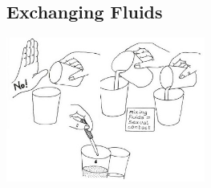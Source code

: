 \begin{multicols}{2}
\columnbreak

\subsection{Exchanging Fluids}

\begin{center}
\includegraphics[width=0.49\textwidth]{./img/vso/hiv-passing.jpg}
\end{center}


\end{multicols}
